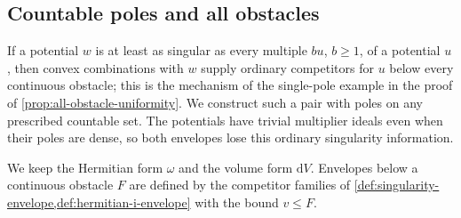 \subsection{Countable poles and all obstacles}
\label{subsec:countable-pole-obstacles}

If a potential $w$ is at least as singular as every multiple $bu$, $b\geq1$, of a potential $u$, then convex combinations with $w$ supply ordinary competitors for $u$ below every continuous obstacle; this is the mechanism of the single-pole example in the proof of \cref{prop:all-obstacle-uniformity}. We construct such a pair with poles on any prescribed countable set. The potentials have trivial multiplier ideals even when their poles are dense, so both envelopes lose this ordinary singularity information.

We keep the Hermitian form $\omega$ and the volume form $\mathrm dV$. Envelopes below a continuous obstacle $F$ are defined by the competitor families of \cref{def:singularity-envelope,def:hermitian-i-envelope} with the bound $v\leq F$.

